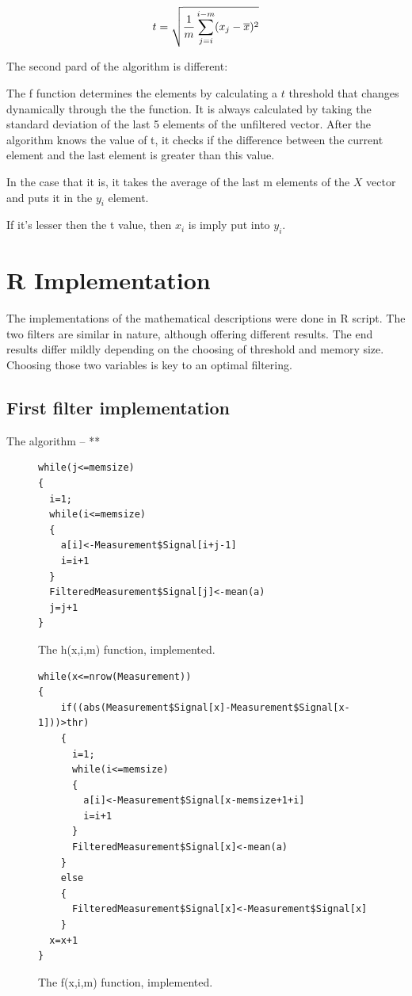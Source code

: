 \begin{equation}\fontsize{15pt}{2}
t=\sqrt{{1\over m}\sum\limits_{j=i}^{i-m}(x_j-\overline{x})^2}
\end{equation}



The second pard of the algorithm is different: 

The f function determines the elements by calculating a $t$ threshold that changes dynamically through the the function. It is always calculated by taking the standard deviation of the last 5 elements of the unfiltered vector. After the algorithm knows the value of t, it checks if the difference between the current element and the last element is greater than this value.

In the case that it is, it takes the average of the last m elements of the $X$ vector and puts it in the $y_i$ element.

If it's lesser then the t value, then $x_i$ is imply put into $y_i$.





\section{R Implementation} 
The implementations of the mathematical descriptions were done in R script.
The two filters are similar in nature, although offering different results.
The end results differ mildly depending on the choosing of threshold and memory size.
Choosing those two variables is key to an optimal filtering.
\subsection{First filter implementation}
The algorithm -- **
\begin{figure}[h!]
\fontsize{14}{2}
	\begin{lstlisting}
while(j<=memsize)
{
  i=1;
  while(i<=memsize)
  {
    a[i]<-Measurement$Signal[i+j-1]
    i=i+1
  }
  FilteredMeasurement$Signal[j]<-mean(a)
  j=j+1
}
	\end{lstlisting}
	\caption{The h(x,i,m) function, implemented.}\label{fig:code}
\end{figure}
\begin{figure}[h!]
\fontsize{14}{2}
	\begin{lstlisting}
while(x<=nrow(Measurement))
{
    if((abs(Measurement$Signal[x]-Measurement$Signal[x-1]))>thr)
    {
      i=1;
      while(i<=memsize)
      {
        a[i]<-Measurement$Signal[x-memsize+1+i]
        i=i+1
      }
      FilteredMeasurement$Signal[x]<-mean(a)
    }
    else
    {
      FilteredMeasurement$Signal[x]<-Measurement$Signal[x]
    }
  x=x+1
}
	\end{lstlisting}
	\caption{The f(x,i,m) function, implemented.}\label{fig:code}
\end{figure}

